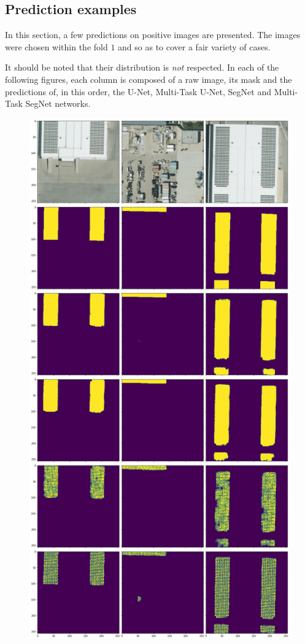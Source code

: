 \documentclass[twocolumn,superscriptaddress,aps,nofootinbib]{revtex4-1}
\begin{document}
\clearpage

\subsection{Prediction examples} \label{subapp:predictions}

In this section, a few predictions on positive images are presented. The images were chosen within the fold $1$ and so as to cover a fair variety of cases.

It should be noted that their distribution is \emph{not} respected. In each of the following figures, each column is composed of a raw image, its mask and the predictions of, in this order, the U-Net, Multi-Task U-Net, SegNet and Multi-Task SegNet networks.

\begin{figure}[h]
    \centering
    \includegraphics[width=\columnwidth]{resources/png/easy.png}

\end{figure}
\end{document}
